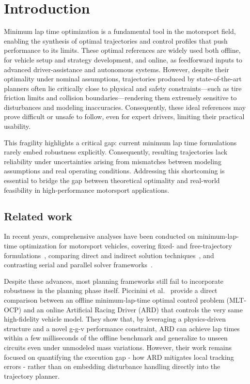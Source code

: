 \section{Introduction}
\label{sec:intro}

Minimum lap time optimization is a fundamental tool in the motorsport field, enabling the synthesis of optimal trajectories and control profiles that push performance to its limits. These optimal references are widely used both offline, for vehicle setup and strategy development, and online, as feedforward inputs to advanced driver-assistance and autonomous systems.
However, despite their optimality under nominal assumptions, trajectories produced by state-of-the-art planners often lie critically close to physical and safety constraints---such as tire friction limits and collision boundaries---rendering them extremely sensitive to disturbances and modeling inaccuracies. Consequently, these ideal references may prove difficult or unsafe to follow, even for expert drivers, limiting their practical usability.

This fragility highlights a critical gap: current minimum lap time formulations rarely embed robustness explicitly. 
Consequently, resulting trajectories lack reliability under uncertainties arising from mismatches between modeling assumptions and real operating conditions. 
Addressing this shortcoming is essential to bridge the gap between theoretical optimality and real-world feasibility in high-performance motorsport applications.

\subsection{Related work}
In recent years, comprehensive analyses have been conducted on minimum-lap-time optimization for motorsport vehicles, covering fixed- and free-trajectory formulations~\cite{Veneri:FreetrajectoryQuasisteadystateOptimalcontrol:2020, Lovato:ThreedimensionalFixedtrajectoryApproaches:2022, Lovato:ThreedimensionalFreetrajectoryQuasisteadystate:2022}, comparing direct and indirect solution techniques~\cite{DalBianco:ComparisonDirectIndirect:2019, Bertolazzi:DirectIndirectApproach:2025}, and contrasting serial and parallel solver frameworks~\cite{Biniewicz:QuasisteadystateMinimumLap:2024, Bartali:SchwarzDecompositionParallel:2024, Bartali:ConsensusbasedAlternatingDirection:2024}.

Despite these advances, most planning frameworks still fail to incorporate robustness in the planning phase itself. Piccinini et al.~\cite{Piccinini:HowOptimalMinimumtime:2024} provide a direct comparison between an offline minimum-lap-time optimal control problem (MLT-OCP) and an online Artificial Racing Driver (ARD) that controls the very same high-fidelity vehicle model. They show that, by leveraging a physics-driven structure and a novel g-g-v performance constraint, ARD can achieve lap times within a few milliseconds of the offline benchmark and generalize to unseen circuits even under unmodeled mass variations. However, their work remains focused on quantifying the execution gap - how ARD mitigates local tracking errors - rather than on embedding disturbance handling directly into the trajectory planner.

